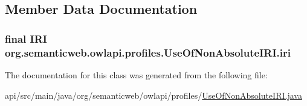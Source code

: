 \subsection{Member Data Documentation}
\hypertarget{classorg_1_1semanticweb_1_1owlapi_1_1profiles_1_1_use_of_non_absolute_i_r_i_a3a40c37db0d708700946d78fd5c110d7}{
\subsubsection[{iri}]{\setlength{\rightskip}{0pt plus 5cm}final {\bf I\-R\-I} org.\-semanticweb.\-owlapi.\-profiles.\-Use\-Of\-Non\-Absolute\-I\-R\-I.\-iri\hspace{0.3cm}{\ttfamily [private]}}}\label{classorg_1_1semanticweb_1_1owlapi_1_1profiles_1_1_use_of_non_absolute_i_r_i_a3a40c37db0d708700946d78fd5c110d7}


The documentation for this class was generated from the following file\-:\begin{DoxyCompactItemize}
\item 
api/src/main/java/org/semanticweb/owlapi/profiles/\hyperlink{_use_of_non_absolute_i_r_i_8java}{Use\-Of\-Non\-Absolute\-I\-R\-I.\-java}\end{DoxyCompactItemize}
